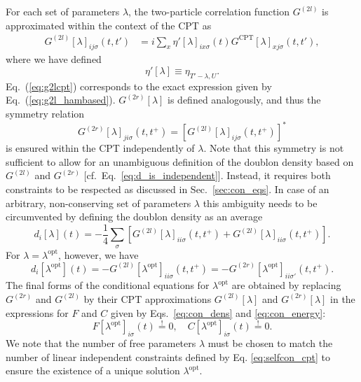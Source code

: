 \documentclass[twocolumn,prb,showpacs,aps,superscriptaddress]{revtex4}
\begin{document}
For each set of parameters $\lambda$, the two-particle correlation function
$G^{(2l)}$ is approximated within the context of the CPT as 
\begin{align}
  \label{eq:g2lcpt}
  G^{(2l)}[\lambda]_{ij\sigma}(t,t') 
  &= 
  i\sum_x 
  \eta'[\lambda]_{ix\sigma}(t)
  G^\text{CPT}[\lambda]_{xj\sigma}(t,t') , 
\end{align}
where we have defined
\begin{equation}
\eta'[\lambda]\equiv \eta_{T'-\lambda, U} . 
\end{equation}
Eq.\ (\ref{eq:g2lcpt}) corresponds to the exact expression given by Eq.\
(\ref{eq:g2l_hambased}).  $G^{(2r)}[\lambda]$ is defined analogously, and thus
the symmetry relation
\begin{equation}
  \label{eq:g2symmetry}
  G^{(2r)}[\lambda]_{ji\sigma}(t,t^+) 
  = 
  \left[G^{(2l)}[\lambda]_{ij\sigma}(t,t^+)\right]^*
\end{equation}
is ensured within the CPT independently of $\lambda$. Note that this symmetry
is not sufficient to allow for an unambiguous definition of the doublon density
based on $G^{(2l)}$ and $G^{(2r)}$ [cf.\ Eq.\ \eqref{eq:d_is_independent}].
Instead, it requires both constraints to be respected as discussed in
Sec.\ \ref{sec:con_eqs}. In case of an arbitrary, non-conserving set of
parameters $\lambda$ this ambiguity needs to be circumvented by defining the
doublon density as an average 
\begin{equation}
  d_i[\lambda](t) 
  = 
  -\frac{1}{4}
  \sum_\sigma
  \left[
    G^{(2l)}[\lambda]_{ii\sigma}(t,t^+) 
    +
    G^{(2l)}[\lambda]_{ii\sigma}(t,t^+) 
  \right].
\end{equation}
For $\lambda = \lambda^\text{opt}$, however, we have
\begin{equation}
  d_i[\lambda^\text{opt}](t) 
  = 
  -G^{(2l)}[\lambda^\text{opt}]_{ii\sigma}(t,t^+) 
  = 
  -G^{(2r)}[\lambda^\text{opt}]_{ii\sigma'}(t,t^+).
\end{equation}
The final forms of the conditional equations for $\lambda^\text{opt}$ are
obtained by replacing $G^{(2r)}$ and $G^{(2l)}$ by their CPT approximations
$G^{(2l)}[\lambda]$ and $G^{(2r)}[\lambda]$ in the expressions for $F$ and $C$
given by Eqs.\ \eqref{eq:con_dens} and \eqref{eq:con_energy}:
\begin{equation}
  \label{eq:selfcon_cpt}
  F[\lambda^\text{opt}]_{i\sigma}(t)
  \stackrel{!}{=}
  0,
  \quad
  C[\lambda^\text{opt}]_{i\sigma}(t)
  \stackrel{!}{=}
  0.
\end{equation}
We note that the number of free parameters $\lambda$ must be chosen to match
the number of linear independent constraints defined by Eq.
\eqref{eq:selfcon_cpt} to ensure the existence of a unique solution
$\lambda^\text{opt}$.
\end{document}
